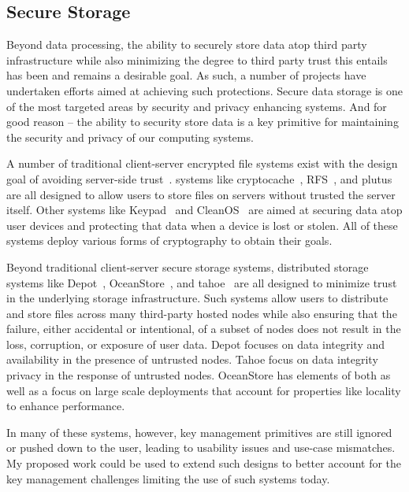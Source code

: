 \subsection{Secure Storage}

Beyond data processing, the ability to securely store data atop third
party infrastructure while also minimizing the degree to third party
trust this entails has been and remains a desirable goal. As such, a
number of projects have undertaken efforts aimed at achieving such
protections.  Secure data storage is one of the most targeted areas by
security and privacy enhancing systems. And for good reason -- the
ability to security store data is a key primitive for maintaining the
security and privacy of our computing systems.

A number of traditional client-server encrypted file systems exist
with the design goal of avoiding server-side
trust~\cite{kher2005}. systems like cryptocache~\cite{jensen2000},
RFS~\cite{dong2011}, and plutus~\cite{kallahalla2003} are all designed
to allow users to store files on servers without trusted the server
itself. Other systems like Keypad~\cite{geambasu2011} and
CleanOS~\cite{tang2012} are aimed at securing data atop user devices
and protecting that data when a device is lost or stolen. All of these
systems deploy various forms of cryptography to obtain their goals.
 
Beyond traditional client-server secure storage systems, distributed
storage systems like Depot~\cite{mahajan2011},
OceanStore~\cite{kubiatowicz2000}, and tahoe~\cite{wilcox-o'hearn2008}
are all designed to minimize trust in the underlying storage
infrastructure. Such systems allow users to distribute and store files
across many third-party hosted nodes while also ensuring that the
failure, either accidental or intentional, of a subset of nodes does
not result in the loss, corruption, or exposure of user data. Depot
focuses on data integrity and availability in the presence of
untrusted nodes. Tahoe focus on data integrity privacy in the response
of untrusted nodes. OceanStore has elements of both as well as a focus
on large scale deployments that account for properties like locality
to enhance performance.

In many of these systems, however, key management primitives are still
ignored or pushed down to the user, leading to usability issues and
use-case mismatches. My proposed work could be used to extend such
designs to better account for the key management challenges limiting
the use of such systems today.

